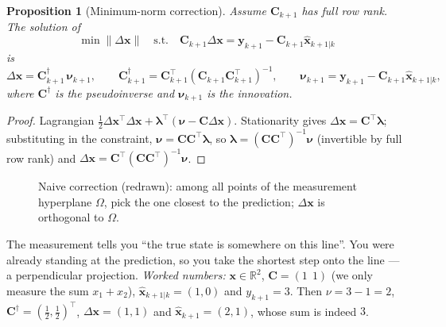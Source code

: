 \documentclass[11pt,a4paper]{article}
\newcommand{\hx}{\hat{\boldsymbol{x}}}
\newcommand{\bx}{\boldsymbol{x}}
\newcommand{\by}{\boldsymbol{y}}
\newcommand{\bnu}{\boldsymbol{\nu}}
\newcommand{\mC}{\mathbf{C}}
\newcommand{\pinv}{^{\dagger}}
\newcommand{\tp}{^{\top}}
\newcommand{\Rn}{\mathbb{R}}
\theoremstyle{plain}
\newtheorem{proposition}[theorem]{Proposition}
\theoremstyle{definition}
\theoremstyle{remark}
\begin{document}
\begin{proposition}[Minimum-norm correction]\label{prop:minnorm}
Assume $\mC_{k+1}$ has full row rank. The solution of
\[
\min\|\Delta\bx\|\quad\text{s.t.}\quad \mC_{k+1}\Delta\bx=\by_{k+1}-\mC_{k+1}\hx_{k+1|k}
\]
is
\begin{equation}\label{eq:dx0}
\Delta\bx=\mC_{k+1}\pinv\,\bnu_{k+1},\qquad
\mC_{k+1}\pinv=\mC_{k+1}\tp(\mC_{k+1}\mC_{k+1}\tp)^{-1},\qquad
\bnu_{k+1}=\by_{k+1}-\mC_{k+1}\hx_{k+1|k},
\end{equation}
where $\mC\pinv$ is the \emph{pseudoinverse} and $\bnu_{k+1}$ is the \emph{innovation}.
\end{proposition}
\begin{proof}
Lagrangian $\tfrac12\Delta\bx\tp\Delta\bx+\boldsymbol\lambda\tp(\bnu-\mC\Delta\bx)$. Stationarity gives
$\Delta\bx=\mC\tp\boldsymbol\lambda$; substituting in the constraint, $\bnu=\mC\mC\tp\boldsymbol\lambda$, so
$\boldsymbol\lambda=(\mC\mC\tp)^{-1}\bnu$ (invertible by full row rank) and $\Delta\bx=\mC\tp(\mC\mC\tp)^{-1}\bnu$.
\end{proof}

\begin{figure}[H]
\centering
{}
\caption{Naive correction (redrawn): among all points of the measurement hyperplane $\Omega$, pick the one closest to the
prediction; $\Delta\bx$ is orthogonal to $\Omega$.}\label{fig:naive}
\end{figure}

\begin{intuition}
The measurement tells you ``the true state is somewhere on this line''. You were already standing at the prediction, so
you take the shortest step onto the line --- a perpendicular projection. \emph{Worked numbers:} $\bx\in\Rn^2$,
$\mC=(1\ \ 1)$ (we only measure the sum $x_1+x_2$), $\hx_{k+1|k}=(1,0)$ and $y_{k+1}=3$. Then $\nu=3-1=2$,
$\mC\pinv=(\tfrac12,\tfrac12)\tp$, $\Delta\bx=(1,1)$ and $\hx_{k+1}=(2,1)$, whose sum is indeed $3$.
\end{intuition}
\end{document}
